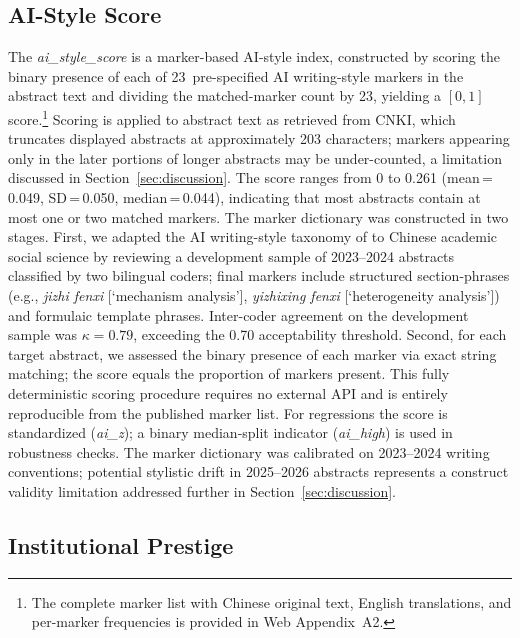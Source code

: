 \documentclass[12pt,a4paper]{article}
\begin{document}
\subsection{AI-Style Score}

The \textit{ai\_style\_score} is a marker-based AI-style index,
constructed by scoring the binary presence of each of
23~pre-specified AI writing-style markers in the abstract text and
dividing the matched-marker count by 23, yielding a $[0,1]$
score.\footnote{The complete marker list with Chinese original text,
  English translations, and per-marker frequencies is provided in
  Web Appendix~A2.}
Scoring is applied to abstract text as retrieved from CNKI, which
truncates displayed abstracts at approximately 203 characters;
markers appearing only in the later portions of longer abstracts may
be under-counted, a limitation discussed in
Section~\ref{sec:discussion}.
The score ranges from 0 to 0.261 (mean\,=\,0.049, SD\,=\,0.050,
median\,=\,0.044), indicating that most abstracts contain at most
one or two matched markers.
The marker dictionary was constructed in two stages.
First, we adapted the AI writing-style taxonomy of \citet{Liang2024}
to Chinese academic social science by reviewing a development sample
of 2023--2024 abstracts classified by two bilingual coders; final
markers include structured section-phrases
(e.g., \textit{jizhi fenxi} [`mechanism analysis'],
\textit{yizhixing fenxi} [`heterogeneity analysis'])
and formulaic template phrases.
Inter-coder agreement on the development sample was
$\kappa = 0.79$, exceeding the 0.70 acceptability threshold.
Second, for each target abstract, we assessed the binary presence of
each marker via exact string matching; the score equals the proportion
of markers present.
This fully deterministic scoring procedure requires no external API
and is entirely reproducible from the published marker list.
For regressions the score is standardized (\textit{ai\_z}); a binary
median-split indicator (\textit{ai\_high}) is used in robustness checks.
The marker dictionary was calibrated on 2023--2024 writing conventions;
potential stylistic drift in 2025--2026 abstracts represents a
construct validity limitation addressed further in Section~\ref{sec:discussion}.

\subsection{Institutional Prestige}
\end{document}

